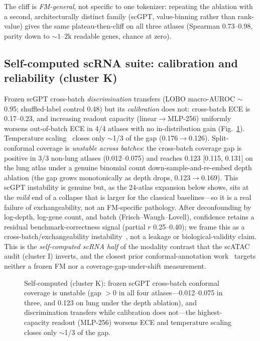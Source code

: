 \documentclass[fleqn,10pt,lineno]{wlpeerj}  %
\newcommand{\fitfig}[1]{\resizebox{\ifdim\width>\linewidth\linewidth\else\width\fi}{!}{#1}}
\begin{document}
The cliff is \emph{FM-general}, not specific to one tokenizer: repeating the ablation with a second, architecturally distinct family (scGPT, value-binning rather than rank-value) gives the same plateau-then-cliff on all three atlases (Spearman 0.73--0.98, parity down to ${\sim}1$--$2$k readable genes, chance at zero).

\FloatBarrier
\subsection{Self-computed scRNA suite: calibration and reliability (cluster K)}
Frozen scGPT cross-batch \emph{discrimination} transfers (LOBO macro-AUROC $\sim$0.95; shuffled-label control 0.48) but its \emph{calibration} does not: cross-batch ECE is 0.17--0.23, and increasing readout capacity (linear$\to$MLP-256) uniformly worsens out-of-batch ECE in 4/4 atlases with no in-distribution gain (Fig.~\ref{fig:scrnacalib}). Temperature scaling~\cite{guo2017} closes only $\sim$1/3 of the gap (0.176$\to$0.126). Split-conformal coverage is \emph{unstable across batches}: the cross-batch coverage gap is positive in 3/3 non-lung atlases (0.012--0.075) and reaches 0.123 [0.115, 0.131] on the lung atlas under a genuine binomial count down-sample-and-re-embed depth ablation (the gap grows monotonically as depth drops, 0.123$\to$0.169). This scGPT instability is genuine but, as the 24-atlas expansion below shows, sits at the \emph{mild} end of a collapse that is larger for the classical baselines---so it is a real failure of exchangeability, not an FM-specific pathology. After deconfounding by log-depth, log-gene count, and batch (Frisch--Waugh--Lovell), confidence retains a residual benchmark-correctness signal (partial $r$ 0.25--0.40); we frame this as a cross-batch/exchangeability instability~\cite{barber2023}, not a leakage or biological-validity claim. This is the \emph{self-computed scRNA half} of the modality contrast that the scATAC audit (cluster I) inverts, and the closest prior conformal-annotation work~\cite{lopezdecastro2025} targets neither a frozen FM nor a coverage-gap-under-shift measurement.

\begin{figure}[htb]\centering\fitfig{}
\caption{Self-computed (cluster K): frozen scGPT cross-batch conformal coverage is unstable (gap $>0$ in all four atlases---0.012--0.075 in three, and 0.123 on lung under the depth ablation), and discrimination transfers while calibration does not---the highest-capacity readout (MLP-256) worsens ECE and temperature scaling closes only $\sim$1/3 of the gap.}\label{fig:scrnacalib}\end{figure}
\end{document}
